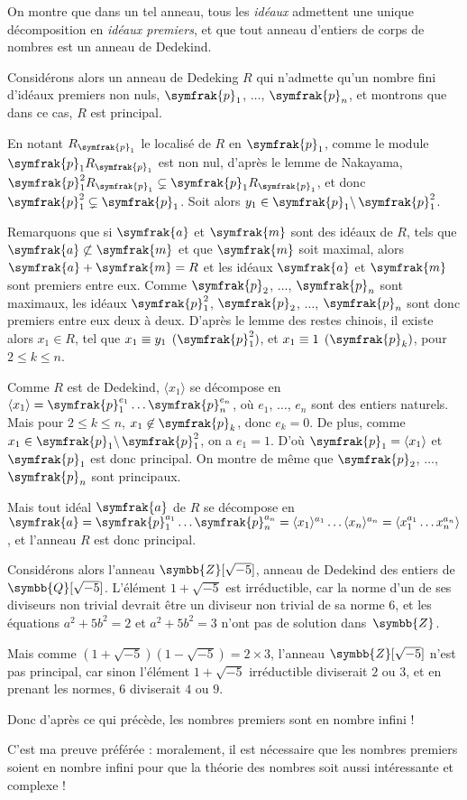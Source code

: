 \documentclass[a4paper,11pt]{article}
\newcommand{\Z}{\ensuremath{\symbb{Z}}\xspace}
\newcommand{\Q}{\ensuremath{\symbb{Q}}\xspace}
\newcommand{\ip}{\ensuremath{\symfrak{p}}\xspace}
\newcommand{\ia}{\ensuremath{\symfrak{a}}\xspace}
\newcommand{\im}{\ensuremath{\symfrak{m}}\xspace}
\begin{document}
\noindent
On montre que dans un tel anneau, tous les \emph{idéaux} admettent une
unique décomposition en \emph{idéaux premiers}, et que tout anneau
d'entiers de corps de nombres est un anneau de Dedekind.

\medskip
Considérons alors un anneau de Dedeking $R$ qui n'admette qu'un nombre fini
d'idéaux premiers non nuls, $\ip_1$, $\dots$, $\ip_n$, et montrons que dans
ce cas, $R$ est principal.

En notant $R_{\ip_1}$ le localisé de $R$ en $\ip_1$, comme le module
$\ip_1R_{\ip_1}$ est non nul, d'après le lemme de Nakayama,
$\ip_1^2 R_{\ip_1} \subsetneq \ip_1 R_{\ip_1}$,
et donc $\ip_1^2 \subsetneq \ip_1$.
Soit alors $y_1\in\ip_1\backslash\,\ip_1^2$.

Remarquons que si $\ia$ et $\im$ sont des idéaux de $R$, tels que
$\ia\not\subset\im$ et que $\im$ soit maximal, alors $\ia+\im=R$ et
les idéaux $\ia$ et $\im$ sont premiers entre eux.
Comme $\ip_2$, $\dots$, $\ip_n$ sont maximaux, les idéaux
$\ip_1^2$, $\ip_2$, $\dots$, $\ip_n$ sont donc premiers entre eux
deux à deux.
D'après le lemme des restes chinois, il existe alors $x_1\in R$, tel que
$x_1\equiv y_1 \pod{\ip_1^2}$, et $x_1\equiv 1 \pod{\ip_k}$,
pour $2 \le k \le n$.

Comme $R$ est de Dedekind, $\langle x_1\rangle$ se décompose en
$\langle x_1\rangle=\ip_1^{e_1}\dots\ip_n^{e_n}$, où $e_1$, $\dots$, $e_n$
sont des entiers naturels.
Mais pour $2\le k\le n$, $x_1\not\in\ip_k$, donc $e_k=0$.
De plus, comme $x_1\in\ip_1\backslash\,\ip_1^2$, on a $e_1=1$.
D'où $\ip_1=\langle x_1\rangle$ et $\ip_1$ est donc principal.
On montre de même que $\ip_2$, $\dots$, $\ip_n$ sont principaux.

Mais tout idéal $\ia$ de $R$ se décompose en
$\ia=\ip_1^{a_1}\dots\ip_n^{a_n}=
 \langle x_1\rangle^{a_1}\dots\langle x_n\rangle^{a_n}=
 \langle x_1^{a_1}\dots x_n^{a_n}\rangle$,
et l'anneau $R$ est donc principal.

\medskip
Considérons alors l'anneau $\Z[\sqrt{-5}]$, anneau de Dedekind des entiers
de $\Q[\sqrt{-5}]$. L'élément $1+\sqrt{-5}$ est irréductible, car la norme
d'un de ses diviseurs non trivial devrait être un diviseur non trivial de sa
norme 6, et les équations $a^2+5b^2=2$ et $a^2+5b^2=3$ n'ont pas de solution
dans~$\Z$.

Mais comme $(1+\sqrt{-5})(1-\sqrt{-5})=2\times3$, l'anneau $\Z[\sqrt{-5}]$
n'est pas principal, car sinon l'élément $1+\sqrt{-5}$ irréductible
diviserait $2$ ou $3$, et en prenant les normes, $6$ diviserait $4$ ou $9$.

Donc d'après ce qui précède, les nombres premiers sont en nombre infini !

\medskip
C'est ma preuve préférée : moralement, il est nécessaire que les nombres
premiers soient en nombre infini pour que la théorie des nombres soit
aussi intéressante et complexe !
\end{document}
